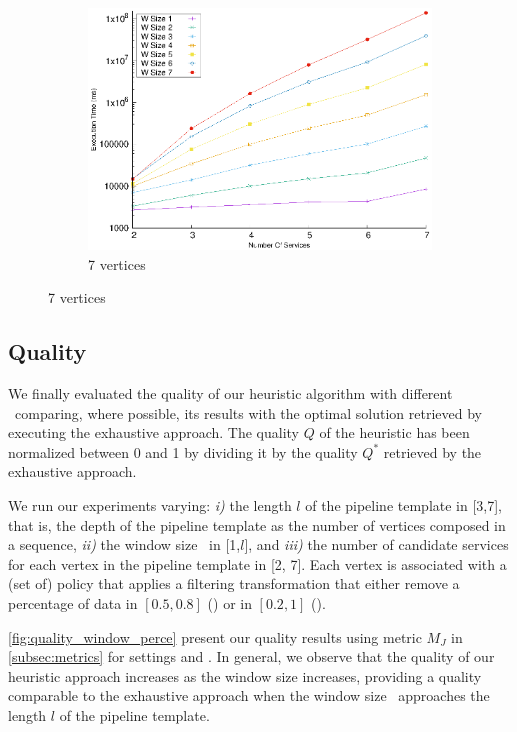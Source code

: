 \begin{figure}[!t]
\begin{subfigure}{0.45\textwidth}
      \includegraphics[width=\textwidth]{Images/graphs/window_time_performance_qualitative_n7_s7_50_80_n7}
      \caption{7 vertices}
      \label{fig:time_window_perce_wide_7n}
    \end{subfigure}
    \label{fig:time_window_perce_average}
  \end{figure}
  
  \subsection{Quality}\label{subsec:experiments_quality}
  We finally evaluated the quality of our heuristic algorithm with different \windowsize\ comparing, where possible, its results with the optimal solution retrieved by executing the exhaustive approach. 
  The quality $Q$ of the heuristic has been normalized between 0 and 1 by dividing it by the quality $Q^*$ retrieved by the exhaustive approach.

  We run our experiments varying: \emph{i)} the length $l$ of the pipeline template in [3,7], that is, the depth of the pipeline template as the number of vertices composed in a sequence, \emph{ii)} the window size \windowsize\ in [1,$l$], and \emph{iii)} the number of candidate services for each vertex in the pipeline template in [2, 7]. Each vertex is associated with a (set of) policy that applies a filtering transformation that either remove a percentage of data in $[0.5,0.8]$ (\average) or in $[0.2,1]$ (\wide).

  \cref{fig:quality_window_perce} present our quality results using metric $M_J$ in \cref{subsec:metrics} for settings \wide and \average.
  In general, we observe that the quality of our heuristic approach increases as the window size increases, providing a quality comparable to the exhaustive approach when the window size \windowsize\ approaches the length $l$ of the pipeline template.


